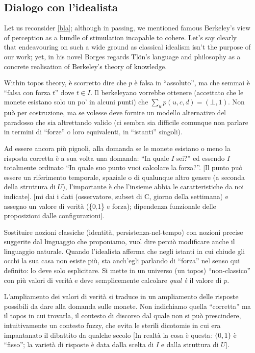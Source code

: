\subsection{Dialogo con l'idealista}\label{berkelei}
Let us reconsider \autoref{bla}; although in passing, we mentioned famous Berkeley's view of perception as a bundle of stimulation incapable to cohere. Let's say clearly that endeavouring on such a wide ground as classical idealism isn't the purpose of our work; yet, in his novel Borges regards Tl\"on's language and philosophy as a concrete realisation of Berkeley's theory of knowledge.

Within topos theory, è scorretto dire che $p$ è falsa in ``assoluto'', ma che semmai è ``falsa con forza $t$'' dove $t \in I$. Il berkeleyano vorrebbe ottenere (accettato che le monete esistano solo un po' in alcuni punti) che $\sum_u p(u,c,d) = (\bot,1)$. Non può per costruzione, ma se volesse deve fornire un modello alternativo del paradosso che sia altrettando valido (ci sembra sia difficile comunque non parlare in termini di ``forze'' o loro equivalenti, in ``istanti'' singoli).  

Ad essere ancora più pignoli, alla domanda se le monete esistano o meno la risposta corretta è a sua volta una domanda: ``In quale $I$ sei?'' ed essendo $I$ totalmente ordinato ``In quale suo punto vuoi calcolare la forza?''. [Il punto può essere un riferimento temporale, spaziale o di qualunque altro genere (a seconda della struttura di $U$), l'importante è che l'insieme abbia le caratteristiche da noi indicate]. [mi dai i dati (osservatore, subset di C, giorno della settimana) e assegno un valore di verità (\{0,1\} e forza); dipendenza funzionale delle proposizioni dalle configurazioni]. 

Sostituire nozioni classiche (identità, persistenza-nel-tempo) con nozioni precise suggerite dal linguaggio che proponiamo, vuol dire perciò modificare anche il linguaggio naturale. Quando l'idealista afferma che negli istanti in cui chiude gli occhi la sua casa non esiste più, sta anch'egli parlando di ``forza'' nel senso qui definito: lo deve solo esplicitare. Si mette in un universo (un topos) ``non-classico'' con più valori di verità e deve semplicemente calcolare \emph{qual è} il valore di $p$. 

L'ampliamento dei valori di verità si traduce in un ampliamento delle risposte possibili da dare alla domanda sulle monete. Non indichiamo quella ``corretta'' ma il topos in cui trovarla, il contesto di discorso dal quale non si può prescindere, intuitivamente un contesto fuzzy, che evita le sterili dicotomie in cui era impantanato il dibattito da qualche secolo [In realtà la cosa è questa: $\{0,1\}$ è ``fisso''; la varietà di risposte è data dalla scelta di $I$ e dalla struttura di $U$].

